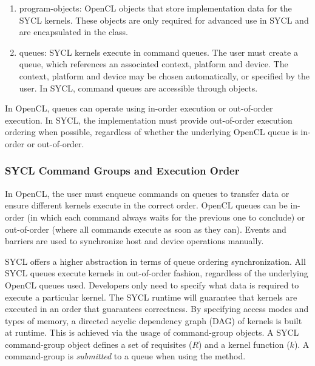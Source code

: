 \begin{enumerate}
\item \Glspl{program-object}: OpenCL objects that store implementation data
for the SYCL kernels. These objects are only required for advanced use in SYCL
and are encapsulated in the  class.

\item \Glspl{queue}: SYCL kernels execute in command queues. The user
must create a queue, which references an associated context, platform and
device. The context, platform and device may be chosen automatically, or
specified by the user. In SYCL, command queues are accessible through
 objects.

\end{enumerate}

In OpenCL, queues can operate using in-order execution or out-of-order
execution. In SYCL, the implementation must provide out-of-order execution ordering when possible, regardless of
whether the underlying OpenCL queue is in-order or out-of-order.

\subsubsection{SYCL Command Groups and Execution Order}

In OpenCL, the user must enqueue commands on queues to transfer data or
ensure different kernels execute in the correct order. 
OpenCL queues can be in-order (in which each command always waits for the
previous one to conclude) or out-of-order (where all commands execute as soon
as they can).
Events and barriers are used to synchronize host and device operations manually.

SYCL offers a higher abstraction in terms of queue ordering synchronization.
All SYCL queues execute kernels in out-of-order fashion, 
regardless of the underlying OpenCL queues used.
Developers only need to specify what data is required to execute a particular
kernel. The SYCL runtime will guarantee that kernels are executed in an order
that guarantees correctness.
By specifying access modes and types of memory, a directed acyclic dependency
graph (DAG) of kernels is built at runtime.  This is achieved via the usage of
\gls{command-group} objects.  A SYCL \gls{command-group} object defines a set
of requisites ($R$) and a kernel function ($k$).  A \gls{command-group} is
\textit{submitted} to a queue when using the
 method.

